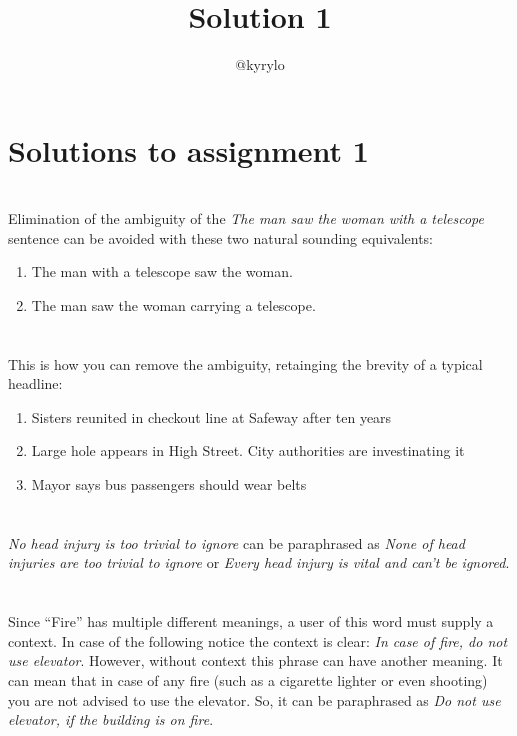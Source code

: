 \documentclass{article}
\title{Solution 1}
\author{@kyrylo}
\begin{document}
\section*{Solutions to assignment 1}

\section{}

Elimination of the ambiguity of the {\it The man saw the woman with a telescope}
sentence can be avoided with these two natural sounding equivalents:

\begin{enumerate}
\item The man with a telescope saw the woman.
\item The man saw the woman carrying a telescope.
\end{enumerate}

\section{}

This is how you can remove the ambiguity, retainging the brevity of a typical
headline:

\begin{enumerate}
\item Sisters reunited in checkout line at Safeway after ten years
\item Large hole appears in High Street. City authorities are investinating it
\item Mayor says bus passengers should wear belts
\end{enumerate}

\section{}

{\it No head injury is too trivial to ignore} can be paraphrased as {\it None
  of head injuries are too trivial to ignore} or {\it Every head injury is vital
  and can't be ignored}.

\section{}

Since ``Fire'' has multiple different meanings, a user of this word must supply
a context. In case of the following notice the context is clear: {\it In case of
  fire, do not use elevator}. However, without context this phrase can have
another meaning.  It can mean that in case of any fire (such as a cigarette
lighter or even shooting) you are not advised to use the elevator. So, it can be
paraphrased as {\it Do not use elevator, if the building is on fire}.
\end{document}
